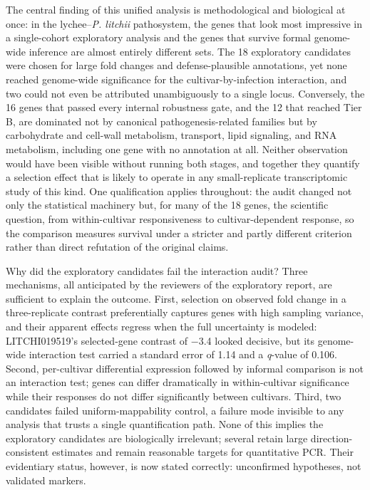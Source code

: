 \documentclass[12pt,letterpaper]{article}
\begin{document}
The central finding of this unified analysis is methodological and biological at once: in the lychee–\textit{P. litchii} pathosystem, the genes that look most impressive in a single-cohort exploratory analysis and the genes that survive formal genome-wide inference are almost entirely different sets. The 18 exploratory candidates were chosen for large fold changes and defense-plausible annotations, yet none reached genome-wide significance for the cultivar-by-infection interaction, and two could not even be attributed unambiguously to a single locus. Conversely, the 16 genes that passed every internal robustness gate, and the 12 that reached Tier B, are dominated not by canonical pathogenesis-related families but by carbohydrate and cell-wall metabolism, transport, lipid signaling, and RNA metabolism, including one gene with no annotation at all. Neither observation would have been visible without running both stages, and together they quantify a selection effect that is likely to operate in any small-replicate transcriptomic study of this kind. One qualification applies throughout: the audit changed not only the statistical machinery but, for many of the 18 genes, the scientific question, from within-cultivar responsiveness to cultivar-dependent response, so the comparison measures survival under a stricter and partly different criterion rather than direct refutation of the original claims.

Why did the exploratory candidates fail the interaction audit? Three mechanisms, all anticipated by the reviewers of the exploratory report, are sufficient to explain the outcome. First, selection on observed fold change in a three-replicate contrast preferentially captures genes with high sampling variance, and their apparent effects regress when the full uncertainty is modeled: LITCHI019519's selected-gene contrast of −3.4 looked decisive, but its genome-wide interaction test carried a standard error of 1.14 and a \textit{q}-value of 0.106. Second, per-cultivar differential expression followed by informal comparison is not an interaction test; genes can differ dramatically in within-cultivar significance while their responses do not differ significantly between cultivars. Third, two candidates failed uniform-mappability control, a failure mode invisible to any analysis that trusts a single quantification path. None of this implies the exploratory candidates are biologically irrelevant; several retain large direction-consistent estimates and remain reasonable targets for quantitative PCR. Their evidentiary status, however, is now stated correctly: unconfirmed hypotheses, not validated markers.
\end{document}
